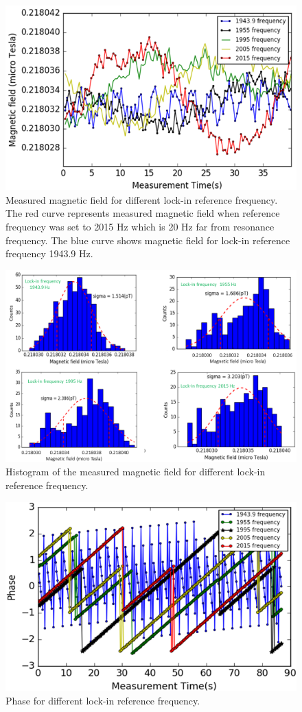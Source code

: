 \begin{figure}[h]
\centering\includegraphics[width=0.8\linewidth]{figures/reference_frequency}
\caption{Measured magnetic field for different lock-in reference frequency. The red curve represents measured magnetic field when reference frequency was set to 2015 Hz which is 20 Hz far from resonance frequency. The blue curve shows magnetic field for lock-in reference frequency 1943.9 Hz.\label{fig:field for different lockin ref freq}}
\end{figure}
   

\begin{figure}[h]
\centering\includegraphics[width=0.8\linewidth]{figures/sigma_diff_lock-in_frequency.png}
\caption{Histogram of the measured magnetic field for different lock-in reference frequency.\label{histogram-of-diff-lock-in freq}}
\end{figure}

\begin{figure}[h]
\centering\includegraphics[width=0.8\linewidth]{figures/phase_vs_time.png}
\caption{Phase for different lock-in reference frequency.\label{phase_different_lock-in_frequency}}
\end{figure} 


